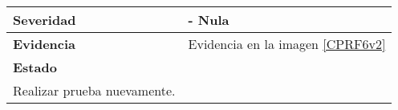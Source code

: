 \begin{longtable}{|l|l|}
\textbf{Severidad}                                                                      &   \textbf{- Nula}                                                                                                                                                                                                                                                                \\ \hline
\textbf{Evidencia}                                                                      &      Evidencia en la imagen \ref{CPRF6v2}                                                                                                                                                                                                                                                                    \\ \hline
\textbf{Estado}                                                                         & \begin{tabular}[c]{@{}l@{}}
Iniciado.\\ Realizar prueba nuevamente.
\end{tabular}                                                                                                                                                                                                                                                            \\ \hline
\end{longtable}